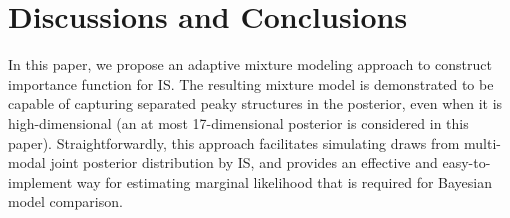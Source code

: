 \documentclass[aoas]{imsart}
\begin{document}
\section{Discussions and Conclusions} \label{sec:disc}
In this paper, we propose an adaptive mixture modeling approach to
construct importance function for IS. The resulting mixture model is
demonstrated to be capable of capturing separated peaky structures
in the posterior, even when it is high-dimensional (an at most
17-dimensional posterior is considered in this paper).
Straightforwardly, this approach facilitates simulating draws from
multi-modal joint posterior distribution by IS, and provides an
effective and easy-to-implement way for estimating marginal
likelihood that is required for Bayesian model comparison.


\end{document}
